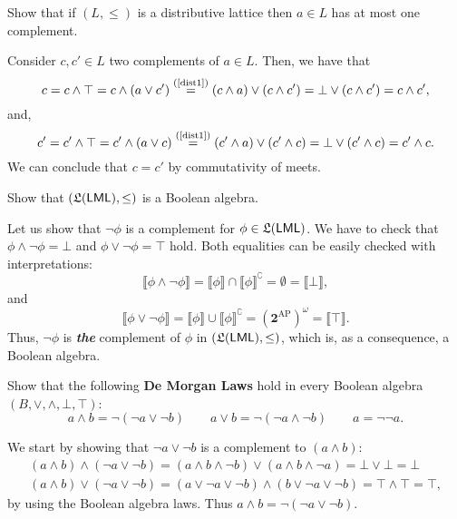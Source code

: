\documentclass[fontsize=16pt,a4paper,DIV=17,parskip=half]{scrartcl}
\renewcommand{\mathsf}[1]{\textup{\textsf{#1}}}
\theoremstyle{definition}
\begin{document}
  \begin{que}
    Show that if $(L, \le)$ is a distributive lattice then $a \in L$ has at most one complement.
  \end{que}

  Consider $c, c' \in L$ two complements of $a \in L$.
  Then, we have that 
  \[
    c = c \wedge \top = c \wedge (a \vee c') \overset {\text{(\ref{dist1})}} =
    (c \wedge a) \vee (c \wedge c') = \bot \vee (c \wedge c') = c \wedge c'
  ,\]
  and,
  \[
    c' = c' \wedge \top = c' \wedge (a \vee c) \overset {\text{(\ref{dist1})}} =
    (c' \wedge a) \vee (c' \wedge c) = \bot \vee (c' \wedge c) = c' \wedge c
  .\] 
  We can conclude that $c = c'$ by commutativity of meets.

  \begin{que}
    Show that $(\mathfrak L(\mathsf{LML}), \le)$ is a Boolean algebra.
  \end{que}

  Let us show that $\lnot \phi$ is a complement for  $\phi \in \mathfrak{L}(\mathsf{LML})$.
  We have to check that $\phi \wedge \lnot \phi = \bot$ and $\phi \vee \lnot \phi = \top$ hold.
  Both equalities can be easily checked with interpretations:
  \[
  \llbracket \phi \land \lnot \phi\rrbracket  = \llbracket \phi\rrbracket \cap \llbracket \phi\rrbracket^\complement   = \emptyset = \llbracket \bot\rrbracket  
  ,\] 
  and
  \[
  \llbracket \phi \lor \lnot \phi\rrbracket  = \llbracket \phi\rrbracket \cup \llbracket \phi\rrbracket^\complement = (\mathbf{2}^\mathrm{AP})^\omega = \llbracket \top\rrbracket  
  .\]
  Thus, $\lnot \phi$ is \textit{\textbf{the}} complement of $\phi$ in $(\mathfrak{L}(\mathsf{LML}), \le)$, which is, as a consequence, a Boolean algebra.

  \begin{que}
    Show that the following \textbf{De Morgan Laws} hold in every Boolean algebra $(B, \vee, \wedge, \bot, \top)$:
    \[
    a \wedge b = \lnot (\lnot a \vee \lnot b)
    \quad\quad
    a \vee b = \lnot (\lnot a \wedge \lnot b)
    \quad\quad
    a = \lnot \lnot a
    .\] 
  \end{que}

  We start by showing that $\lnot a \lor \lnot b$ is a complement to $(a \land b)$:
  \begin{gather*}
    (a \wedge b) \wedge (\lnot a \lor \lnot b)
    =
    (a \wedge b \wedge \lnot b) 
    \lor
    (a \wedge b \wedge \lnot a) 
    = \bot  \lor \bot 
    = \bot\\
    (a \wedge b) \vee (\lnot a \vee \lnot b)
    = (a \vee \lnot a \vee \lnot b) \wedge (b \vee \lnot a \vee \lnot b)
    = \top \wedge \top = \top 
  ,\end{gather*}
  by using the Boolean algebra laws.
  Thus $a \wedge b = \lnot (\lnot a \vee \lnot b)$.
\end{document}

